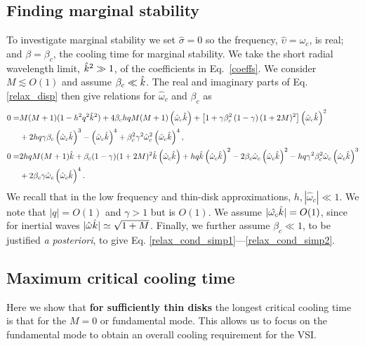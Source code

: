 \subsection{Finding marginal stability}\label{disp_neut_limit}
To investigate marginal stability we set $\hat{\sigma} = 0$ so the
frequency, $\hat{\upsilon}=\hat{\omega}_c$, is real; and $\beta =
\beta_c$,  the cooling time for marginal stability. 
We take the short radial wavelength limit, $\hat{k}^2\gg 1$, of the
coefficients in Eq.\ \ref{coeffs}. We consider $M \lesssim O(1)$ and
assume $\beta_c \ll \hat{k}$.  The real and 
imaginary parts of Eq. \ref{relax_disp} then give relations for $\hat{\omega}_c$ and $\beta_c$ as 
\begin{align}
  0 =&M(M+1)(1-h^2 q^2 \hat{k}^2) + 4\beta_c h q M(M+1)\left(\hat{\omega}_c\hat{k}\right) 
 +\left[1 +
    \gamma\beta_c^2\left(1-\gamma\right)(1+2M)^2\right]\left(\hat{\omega}_c\hat{k}\right)^2 \label{relax_cond1} \\
 &+ 2h q \gamma\beta_c \left(\hat{\omega}_c\hat{k}\right)^3 -  \left(\hat{\omega}_c\hat{k}\right)^4 
  + \beta_c^2\gamma^2\hat{\omega}_c^2
  \left(\hat{\omega}_c\hat{k}\right)^4, \notag \\
   0=& 2h q M (M+1)\hat{k} +
   \beta_c(1-\gamma)(1+2M)^2\hat{k}\left(\hat{\omega}_c\hat{k}\right) 
   + h q \hat{k} \left(\hat{\omega}_c\hat{k}\right)^2 -
   2\beta_c\hat{\omega}_c\left(\hat{\omega}_c\hat{k}\right)^2
   - h q
   \gamma^2\beta_c^2\hat{\omega}_c\left(\hat{\omega}_c\hat{k}\right)^3 \label{relax_cond2} \\
   &+
   2\beta_c\gamma\hat{\omega}_c\left(\hat{\omega}_c\hat{k}\right)^4 \notag. 
\end{align}
We recall that in the low frequency and thin-disk approximations, $h,
|\hat{\omega}_c| \ll 1$. We note that $|q|=O(1)$ and 
$\gamma>1$ but is $O(1)$. We assume $|\hat{\omega_c}\hat{k}|=O(1)$,
since for inertial waves $|\hat{\omega}\hat{k}|\simeq \sqrt{1 + M}$. Finally, we further assume 
$\beta_c \ll 1$, to be justified \emph{a posteriori}, to give 
Eq. \ref{relax_cond_simp1}---\ref{relax_cond_simp2}.   

\subsection{Maximum critical cooling time}\label{max_cool}   
Here we show that {\bf for sufficiently thin disks} the longest critical 
cooling time is that for the $M=0$ or fundamental mode. This allows
us to focus on the fundamental mode to obtain an overall cooling
requirement for the VSI.      

